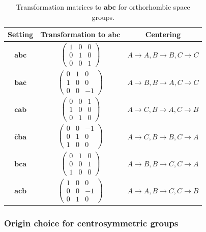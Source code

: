 \begin{table}[htb]
  \centering
  \small
  \caption{Transformation matrices to $\mathbf{abc}$ for orthorhombic space groups.}
  \label{tab:orthorhombic-settings}
  \begin{tabular}{ccc}
    \hline\hline
    Setting & Transformation to $\mathbf{abc}$ & Centering \\
    \hline
    $\mathbf{abc}$
       & $\begin{pmatrix} 1& 0&0 \\ 0& 1&0 \\ 0& 0&1 \end{pmatrix}$
       & $A \to A, B \to B, C \to C$ \\
    $\mathbf{ba\overline{c}}$
      & $\begin{pmatrix} 0&1&0 \\ 1&0&0 \\ 0&0&-1 \end{pmatrix}$
      & $A \to B, B \to A, C \to C$ \\
    $\mathbf{cab}$
      & $\begin{pmatrix}0& 0&1 \\1& 0&0 \\0& 1&0\end{pmatrix}$
      & $A \to C, B \to A, C \to B$ \\
    $\mathbf{\overline{c}ba}$
      & $\begin{pmatrix} 0&0&-1 \\ 0&1&0 \\ 1&0&0 \end{pmatrix}$
      & $A \to C, B \to B, C \to A$ \\
    $\mathbf{bca}$
      & $\begin{pmatrix} 0&1&0 \\ 0&0&1 \\ 1&0&0 \end{pmatrix}$
      & $A \to B, B \to C, C \to A$ \\
    $\mathbf{a\overline{c}b}$
      & $\begin{pmatrix} 1&0&0 \\ 0&0&-1 \\ 0&1&0 \end{pmatrix}$
      & $A \to A, B \to C, C \to B$ \\
    \hline\hline
  \end{tabular}
\end{table}

\subsubsection{Origin choice for centrosymmetric groups}

